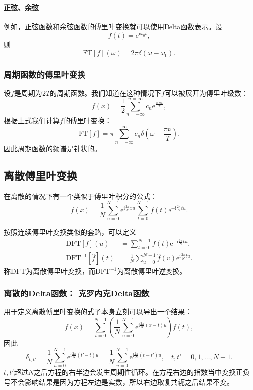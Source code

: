 \documentclass[UTF8]{ctexart}
\newcommand*{\ee}{\mathrm{e}}
\begin{document}
\paragraph{正弦、余弦}
例如，正弦函数和余弦函数的傅里叶变换就可以使用Delta函数表示。设
\[
f(t) = \ee^{\mathrm{i}\omega_0t},
\]
则
\[
\mathrm{FT}[f](\omega) = 2\pi \delta(\omega - \omega_0).
\]

\subsubsection{周期函数的傅里叶变换}

设$f$是周期为$2T$的周期函数。我们知道在这种情况下$f$可以被展开为傅里叶级数：
\[
f(x) = \frac{1}{2} \sum_{n = -\infty}^{n = \infty} c_n \ee^{\frac{\mathrm{i}\pi n x}{T}}, 
\]
根据上式我们计算$f$的傅里叶变换：
\[
\mathrm{FT}[f] = \pi \sum_{n=-\infty}^\infty c_n \delta(\omega - \frac{\pi n}{T}).
\]
因此周期函数的频谱是针状的。

\hypertarget{ux79bbux6563ux5085ux91ccux53f6ux53d8ux6362}{%
\subsection{离散傅里叶变换}\label{ux79bbux6563ux5085ux91ccux53f6ux53d8ux6362}}

在离散的情况下有一个类似于傅里叶积分的公式：
\[
f(x) = \frac{1}{N} \sum_{u=0}^{N-1} \ee^{\mathrm{i} \frac{2\pi}{N} xu} \sum_{t=0}^{N-1} f(t) \ee^{-\mathrm{i} \frac{2\pi}{N}tu}.
\]

按照连续傅里叶变换类似的套路，可以定义
\[
\begin{aligned}
    \mathrm{DFT}[f](u) &= \sum_{t=0}^{N-1} f(t) \ee^{-\mathrm{i} \frac{2\pi}{N}tu}, \\
    \mathrm{DFT}^{-1}[\hat{f}](t) &= \frac{1}{N} \sum_{u=0}^{N-1} \hat{f}(u) \ee^{\mathrm{i} \frac{2\pi}{N} tu}.
\end{aligned}
\]
称$\mathrm{DFT}$为离散傅里叶变换，而$\mathrm{DFT}^{-1}$为离散傅里叶逆变换。

\hypertarget{ux79bbux6563ux7684deltaux51fdux6570-ux514bux7f57ux5185ux514bdeltaux51fdux6570}{%
\subsubsection{离散的Delta函数：
克罗内克Delta函数}\label{ux79bbux6563ux7684deltaux51fdux6570-ux514bux7f57ux5185ux514bdeltaux51fdux6570}}

用于定义离散傅里叶变换的式子本身立刻可以导出一个结果：
\[
f(x) = \sum_{t=0}^{N-1} \left( \frac{1}{N} \sum_{u=0}^{N-1}\ee^{\mathrm{i} \frac{2\pi}{N} (x-t) u} \right) f(t),
\]
因此
\[
\delta_{t,t'} = \frac{1}{N} \sum_{u=0}^{N-1}\ee^{\mathrm{i} \frac{2\pi}{N} (t'-t) u} = \frac{1}{N} \sum_{u=0}^{N-1}\ee^{\mathrm{i} \frac{2\pi}{N} (t-t') u}, \quad t,t' = 0,1, \ldots, N-1.
\]
$t,t'$超过$N$之后方程的右半边会发生周期性循环。在方程右边的指数当中变换正负号不会影响结果是因为方程左边是实数，所以右边取复共轭之后结果不变。
\end{document}

